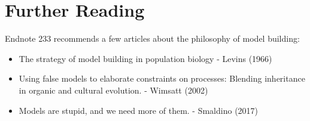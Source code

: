\documentclass[
]{book}
\providecommand{\tightlist}{%
  \setlength{\itemsep}{0pt}\setlength{\parskip}{0pt}}
\begin{document}
\hypertarget{further-reading-9}{%
\section*{Further Reading}\label{further-reading-9}}

Endnote 233 recommends a few articles about the philosophy of model building:

\begin{itemize}
\tightlist
\item
  The strategy of model building in population biology - Levins (1966)
\item
  Using false models to elaborate constraints on processes: Blending inheritance in organic and cultural evolution. - Wimsatt (2002)
\item
  Models are stupid, and we need more of them. - Smaldino (2017)
\end{itemize}

  
\end{document}
